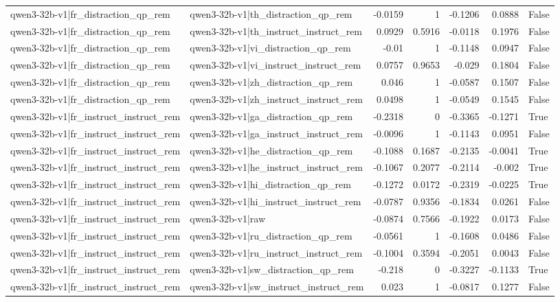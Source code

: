 \begin{table}
\begin{tabular}{l l r r r r l}
qwen3-32b-v1|fr_distraction_qp_rem & qwen3-32b-v1|th_distraction_qp_rem & -0.0159 & 1 & -0.1206 & 0.0888 & False \\
qwen3-32b-v1|fr_distraction_qp_rem & qwen3-32b-v1|th_instruct_instruct_rem & 0.0929 & 0.5916 & -0.0118 & 0.1976 & False \\
qwen3-32b-v1|fr_distraction_qp_rem & qwen3-32b-v1|vi_distraction_qp_rem & -0.01 & 1 & -0.1148 & 0.0947 & False \\
qwen3-32b-v1|fr_distraction_qp_rem & qwen3-32b-v1|vi_instruct_instruct_rem & 0.0757 & 0.9653 & -0.029 & 0.1804 & False \\
qwen3-32b-v1|fr_distraction_qp_rem & qwen3-32b-v1|zh_distraction_qp_rem & 0.046 & 1 & -0.0587 & 0.1507 & False \\
qwen3-32b-v1|fr_distraction_qp_rem & qwen3-32b-v1|zh_instruct_instruct_rem & 0.0498 & 1 & -0.0549 & 0.1545 & False \\
qwen3-32b-v1|fr_instruct_instruct_rem & qwen3-32b-v1|ga_distraction_qp_rem & -0.2318 & 0 & -0.3365 & -0.1271 & True \\
qwen3-32b-v1|fr_instruct_instruct_rem & qwen3-32b-v1|ga_instruct_instruct_rem & -0.0096 & 1 & -0.1143 & 0.0951 & False \\
qwen3-32b-v1|fr_instruct_instruct_rem & qwen3-32b-v1|he_distraction_qp_rem & -0.1088 & 0.1687 & -0.2135 & -0.0041 & True \\
qwen3-32b-v1|fr_instruct_instruct_rem & qwen3-32b-v1|he_instruct_instruct_rem & -0.1067 & 0.2077 & -0.2114 & -0.002 & True \\
qwen3-32b-v1|fr_instruct_instruct_rem & qwen3-32b-v1|hi_distraction_qp_rem & -0.1272 & 0.0172 & -0.2319 & -0.0225 & True \\
qwen3-32b-v1|fr_instruct_instruct_rem & qwen3-32b-v1|hi_instruct_instruct_rem & -0.0787 & 0.9356 & -0.1834 & 0.0261 & False \\
qwen3-32b-v1|fr_instruct_instruct_rem & qwen3-32b-v1|raw & -0.0874 & 0.7566 & -0.1922 & 0.0173 & False \\
qwen3-32b-v1|fr_instruct_instruct_rem & qwen3-32b-v1|ru_distraction_qp_rem & -0.0561 & 1 & -0.1608 & 0.0486 & False \\
qwen3-32b-v1|fr_instruct_instruct_rem & qwen3-32b-v1|ru_instruct_instruct_rem & -0.1004 & 0.3594 & -0.2051 & 0.0043 & False \\
qwen3-32b-v1|fr_instruct_instruct_rem & qwen3-32b-v1|sw_distraction_qp_rem & -0.218 & 0 & -0.3227 & -0.1133 & True \\
qwen3-32b-v1|fr_instruct_instruct_rem & qwen3-32b-v1|sw_instruct_instruct_rem & 0.023 & 1 & -0.0817 & 0.1277 & False \\

\end{tabular}
\end{table}
